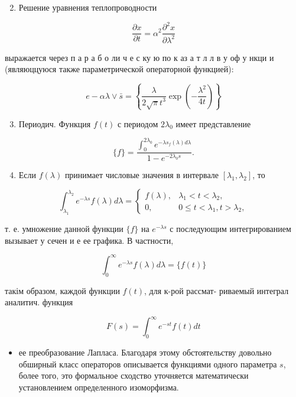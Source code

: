 \documentclass[10pt]{article}
\begin{document}
\begin{enumerate}
  \setcounter{enumi}{1}
  \item Решение уравнения теплопроводности
\end{enumerate}

\[
\frac{\partial x}{\partial t}=\alpha^{2} \frac{\partial^{2} x}{\partial \lambda^{2}}
\]

выражается через п а р а б о ли ч е с ку ю по к аз а т л л в у оф у нкци и (являюццуюся также параметрической операторноӥ функцией):

\[
e-\alpha \lambda \vee \bar{s}=\left\{\frac{\lambda}{2 \sqrt{\pi} t^{3}} \exp \left(-\frac{\lambda^{2}}{4 t}\right)\right\}
\]

\begin{enumerate}
  \setcounter{enumi}{2}
  \item Периодич. Функция $f(t)$ с периодом $2 \lambda_{0}$ имеет представление
\end{enumerate}

\[
\{f\}=\frac{\int_{0}^{2 \lambda_{0}} e^{-\lambda s_{f}(\lambda) d \lambda}}{1-e^{-2 \lambda_{0} s}} .
\]

\begin{enumerate}
  \setcounter{enumi}{3}
  \item Если $f(\lambda)$ принимает числовые значения в интервале $\left[\lambda_{1}, \lambda_{2}\right]$, то
\end{enumerate}

\[
\int_{\lambda_{1}}^{\lambda_{2}} e^{-\lambda s} f(\lambda) d \lambda=\left\{\begin{array}{cl}
f(\lambda), & \lambda_{1}<t<\lambda_{2}, \\
0, & 0 \leqslant t<\lambda_{1}, t>\lambda_{2},
\end{array}\right.
\]

т. е. умножение данной функции $\{f\}$ на $e^{-\lambda s}$ с последующим интегрированием вызывает у сечен и е ее графика. В частности,

\[
\int_{0}^{\infty} e^{-\lambda s} f(\lambda) d \lambda=\{f(t)\}
\]

такім образом, каждой функции $f(t)$, для к-рой рассмат- риваемый интеграл
аналитич. функция

\[
F(s)=\int_{0}^{\infty} e^{-s t} f(t) d t
\]

\begin{itemize}
  \item ее преобразование Лапласа. Благодаря этому обстоятельству довольно обширный класс операторов описывается функциями одного параметра $s$, более того, это формальное сходство уточняется математически установлением определенного изоморфизма.
\end{itemize}
\end{document}
